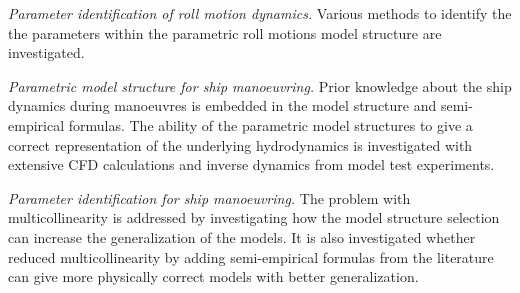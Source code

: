 \begin{tcolorbox}[sharp corners,title=Objective B]
    \emph{Parameter identification of roll motion dynamics.}
    \tcblower
     Various methods to identify the the parameters within the parametric roll motions model structure are investigated.
\end{tcolorbox}

\begin{tcolorbox}[sharp corners,title=Objective C]
    \emph{
        Parametric model structure for ship manoeuvring.
    }
    \tcblower
    Prior knowledge about the ship dynamics during manoeuvres is embedded in the model structure and semi-empirical formulas. The ability of the parametric model structures to give a correct representation of the underlying hydrodynamics is investigated with extensive CFD calculations and inverse dynamics from model test experiments. 
\end{tcolorbox}

\begin{tcolorbox}[sharp corners,title=Objective D]
    \emph{Parameter identification for ship manoeuvring.}
    \tcblower
     The problem with multicollinearity is addressed by investigating how the model structure selection can increase the generalization of the models. It is also investigated whether reduced multicollinearity by adding semi-empirical formulas from the literature can give more physically correct models with better generalization.
\end{tcolorbox}